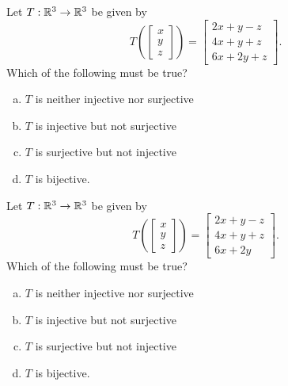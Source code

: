 \begin{applicationActivities}
\begin{activity}{5}
Let $T: \mathbb{R}^3 \rightarrow \mathbb{R}^3$ be given by $$T\left(\begin{bmatrix} x \\ y  \\ z \end{bmatrix} \right) = \begin{bmatrix} 2x+y-z \\ 4x+y+z \\ 6x+2y+z\end{bmatrix}.$$ Which of the following must be true?
\begin{enumerate}[(a)]
\item $T$ is neither injective nor surjective
\item $T$ is injective but not surjective
\item $T$ is surjective but not injective
\item $T$ is bijective.
\end{enumerate}
\end{activity}

\begin{activity}{5}
Let $T: \mathbb{R}^3 \rightarrow \mathbb{R}^3$ be given by $$T\left(\begin{bmatrix} x \\ y  \\ z \end{bmatrix} \right) = \begin{bmatrix} 2x+y-z \\ 4x+y+z \\ 6x+2y\end{bmatrix}.$$   Which of the following must be true?
\begin{enumerate}[(a)]
\item $T$ is neither injective nor surjective
\item $T$ is injective but not surjective
\item $T$ is surjective but not injective
\item $T$ is bijective.
\end{enumerate}
\end{activity}


\end{applicationActivities}

